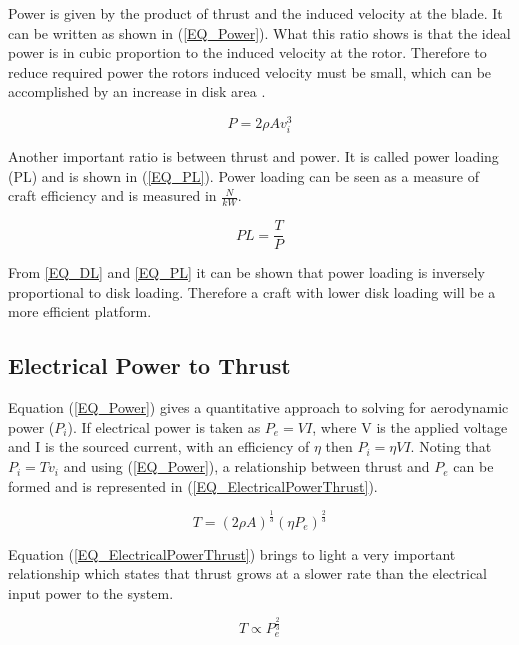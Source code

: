 \documentclass[a4paper, 10pt, conference]{ieeeconf}
\begin{document}
Power is given by the product of thrust and the induced velocity at the blade. It can be written as shown in (\ref{EQ_Power}). What this ratio shows is that the ideal power is in cubic proportion to the induced velocity at the rotor. Therefore to reduce required power the rotors induced velocity must be small, which can be accomplished by an increase in disk area \cite{Leishman}.

\begin{equation}
\label{EQ_Power}
P = 2 \rho A v_{i}^3
\end{equation}

Another important ratio is between thrust and power. It is called power loading (PL) and is shown in (\ref{EQ_PL}). Power loading can be seen as a measure of craft efficiency and is measured in $\frac{N}{kW}$. 

\begin{equation}
\label{EQ_PL}
PL = \frac{T}{P}
\end{equation}

From  \eqref{EQ_DL} and \eqref{EQ_PL} it can be shown that power loading is inversely proportional to disk loading. Therefore a craft with lower disk loading will be a more efficient platform.

\subsection{Electrical Power to Thrust}
Equation (\ref{EQ_Power}) gives a quantitative approach to solving for aerodynamic power ($P_i$). If electrical power is taken as $P_e = VI$, where V is the applied voltage and I is the sourced current, with an efficiency of $\eta$ then $P_i = \eta VI$. Noting that $P_i = T v_i$ and using (\ref{EQ_Power}), a relationship between thrust and $P_e$ can be formed and is represented in (\ref{EQ_ElectricalPowerThrust}).

\begin{equation}
\label{EQ_ElectricalPowerThrust}
T = (2\rho A)^{\frac{1}{3}} (\eta P_e)^{\frac{2}{3}}
\end{equation}

Equation (\ref{EQ_ElectricalPowerThrust}) brings to light a very important relationship which states that thrust grows at a slower rate than the electrical input power to the system.

\begin{equation*}
T \propto P_e^{\frac{2}{3}}
\end{equation*}
\end{document}
